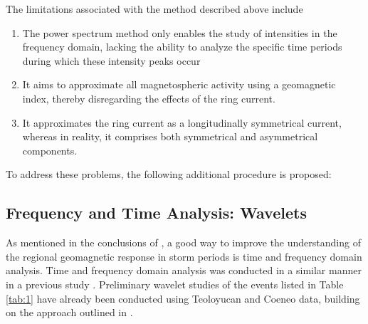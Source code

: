 \documentclass[12pt]{article}
\begin{document}
The limitations associated with the method described above include

\begin{enumerate}
	\item The power spectrum method only enables the study of intensities in the frequency domain, lacking the ability to analyze the specific time periods during which these intensity peaks occur \citep{amory_2021}

	\item It aims to approximate all magnetospheric activity using a geomagnetic index, thereby disregarding the effects of the ring current.

	\item It approximates the ring current as a longitudinally symmetrical current, whereas in reality, it comprises both symmetrical and asymmetrical components.	
\end{enumerate}

To address these problems, the following additional procedure is proposed:

\subsection{Frequency and Time Analysis: Wavelets}
\label{SS:2-3}

As mentioned in the conclusions of \cite{CASTELLANOSVELAZCO2024106237}, a good way to improve the understanding of the regional geomagnetic response in storm periods is time and frequency domain analysis. Time and frequency domain analysis was conducted in a similar manner in a previous study \citep{amory_2021}. Preliminary wavelet studies of the events listed in Table \ref{tab:1} have already been conducted using Teoloyucan and Coeneo data, building on the approach outlined in \cite{amory_2021}.\\
\end{document}
